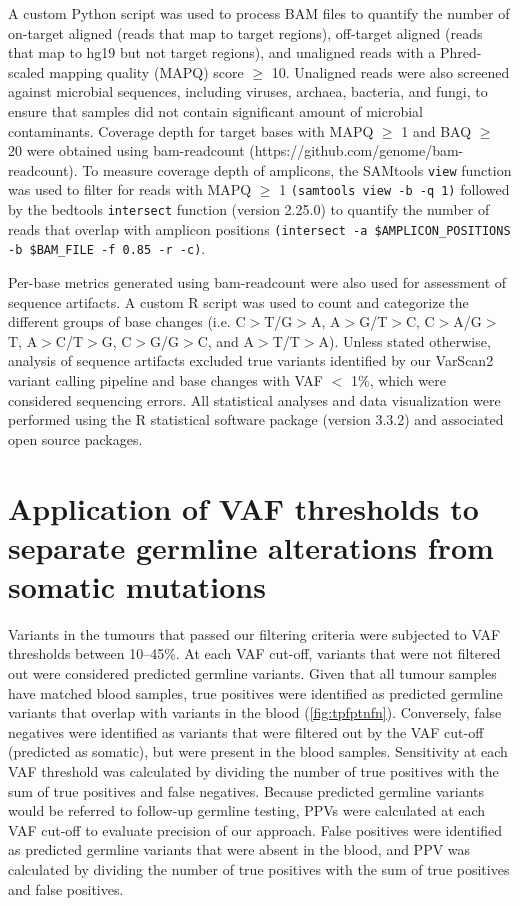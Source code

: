 A custom Python script was used to process BAM files to quantify the number of on-target aligned (reads that map to target regions), off-target aligned (reads that map to hg19 but not target regions), and unaligned reads with a Phred-scaled mapping quality (\acs{MAPQ}) score $\geq$ 10. Unaligned reads were also screened against microbial sequences, including viruses, archaea, bacteria, and fungi, to ensure that samples did not contain significant amount of microbial contaminants. Coverage depth for target bases with MAPQ $\geq$ 1 and BAQ $\geq$ 20 were obtained using bam-readcount (https://github.com/genome/bam-readcount). To measure coverage depth of amplicons, the SAMtools \texttt{view} function was used to filter for reads with MAPQ $\geq$ 1 \texttt{(samtools view -b -q 1)} followed by the bedtools \texttt{intersect} function (version 2.25.0) to quantify the number of reads that overlap with amplicon positions \texttt{(intersect -a \$AMPLICON\_POSITIONS -b \$BAM\_FILE -f 0.85 -r -c)}.

Per-base metrics generated using bam-readcount were also used for assessment of sequence artifacts. A custom R script was used to count and categorize the different groups of base changes (i.e. C$>$T/G$>$A, A$>$G/T$>$C, C$>$A/G$>$T, A$>$C/T$>$G, C$>$G/G$>$C, and A$>$T/T$>$A). Unless stated otherwise, analysis of sequence artifacts excluded true variants identified by our VarScan2 variant calling pipeline and base changes with VAF $<$ 1\%, which were considered sequencing errors. All statistical analyses and data visualization were performed using the R statistical software package (version 3.3.2) and associated open source packages.

\section{Application of VAF thresholds to separate germline alterations from somatic mutations}
\label{sec:ApplicationofVAFthresholdstoseparategermlinealterationsfromsomaticmutations}

Variants in the tumours that passed our filtering criteria were subjected to VAF thresholds between 10--45\%. At each VAF cut-off, variants that were not filtered out were considered predicted germline variants. Given that all tumour samples have matched blood samples, true positives were identified as predicted germline variants that overlap with variants in the blood (\autoref{fig:tpfptnfn}). Conversely, false negatives were identified as variants that were filtered out by the VAF cut-off (predicted as somatic), but were present in the blood samples. Sensitivity at each VAF threshold was calculated by dividing the number of true positives with the sum of true positives and false negatives. Because predicted germline variants would be referred to follow-up germline testing, \acs{PPV}s were calculated at each VAF cut-off to evaluate precision of our approach. False positives were identified as predicted germline variants that were absent in the blood, and PPV was calculated by dividing the number of true positives with the sum of true positives and false positives.


